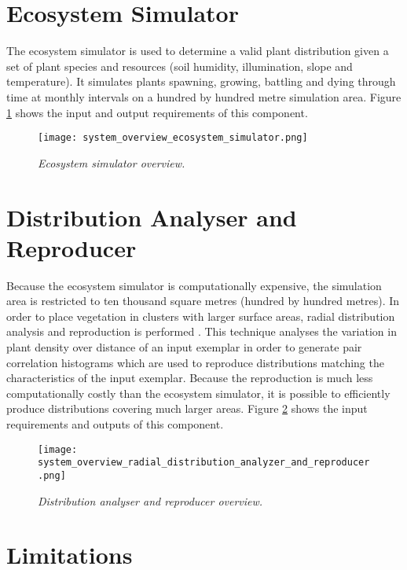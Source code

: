\section{Ecosystem Simulator}

The ecosystem simulator is used to determine a valid plant distribution given a set of plant species and resources (soil humidity, illumination, slope and temperature). It simulates plants spawning, growing, battling and dying through time at monthly intervals on a hundred by hundred metre simulation area. Figure \ref{fig:system_overview_ecosystem_simulator} shows the input and output requirements of this component.

\begin{figure}
\center
	\texttt{[image: system\_overview\_ecosystem\_simulator.png]}
	\caption{ \textit{Ecosystem simulator overview.}}	
	\label{fig:system_overview_ecosystem_simulator}
\end{figure}

\section{Distribution Analyser and Reproducer}

Because the ecosystem simulator is computationally expensive, the simulation area is restricted to ten thousand square metres (hundred by hundred metres). In order to place vegetation in clusters with larger surface areas, radial distribution analysis and reproduction is performed \cite{Emilien,Boudon2007,Lane2002}. This technique analyses the variation in plant density over distance of an input exemplar in order to generate pair correlation histograms which are used to reproduce distributions matching the characteristics of the input exemplar. Because the reproduction is much less computationally costly than the ecosystem simulator, it is possible to efficiently produce distributions covering much larger areas. Figure \ref{fig:system_overview_distribution_analyser_and_reproducer} shows the input requirements and outputs of this component.

\begin{figure}
\center
	\texttt{[image: system\_overview\_radial\_distribution\_analyzer\_and\_reproducer.png]}
	\caption{ \textit{Distribution analyser and reproducer overview.}}	
	\label{fig:system_overview_distribution_analyser_and_reproducer}
\end{figure}

\section{Limitations}

